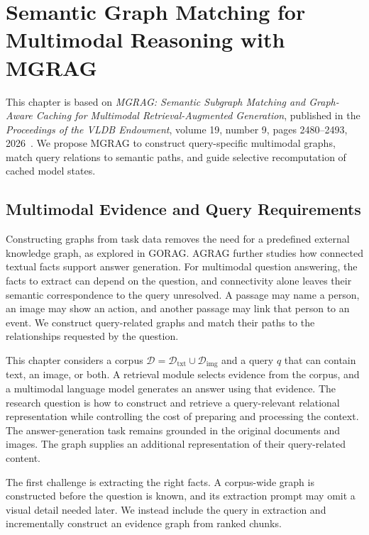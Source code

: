 \chapter{Semantic Graph Matching for Multimodal Reasoning with MGRAG}
\label{ch:mgrag}

This chapter is based on \emph{MGRAG: Semantic Subgraph Matching and Graph-Aware Caching for Multimodal Retrieval-Augmented Generation}, published in the \emph{Proceedings of the VLDB Endowment}, volume 19, number 9, pages 2480--2493, 2026~\cite{mgrag-paper}. We propose MGRAG to construct query-specific multimodal graphs, match query relations to semantic paths, and guide selective recomputation of cached model states.

\section{Multimodal Evidence and Query Requirements}
\label{sec:mgrag:problem}

Constructing graphs from task data removes the need for a predefined external knowledge graph, as explored in GORAG. AGRAG further studies how connected textual facts support answer generation. For multimodal question answering, the facts to extract can depend on the question, and connectivity alone leaves their semantic correspondence to the query unresolved. A passage may name a person, an image may show an action, and another passage may link that person to an event. We construct query-related graphs and match their paths to the relationships requested by the question.

This chapter considers a corpus $\mathcal D=\mathcal D_{\mathrm{txt}}\cup\mathcal D_{\mathrm{img}}$ and a query $q$ that can contain text, an image, or both. A retrieval module selects evidence from the corpus, and a multimodal language model generates an answer using that evidence. The research question is how to construct and retrieve a query-relevant relational representation while controlling the cost of preparing and processing the context. The answer-generation task remains grounded in the original documents and images. The graph supplies an additional representation of their query-related content.

The first challenge is extracting the right facts. A corpus-wide graph is constructed before the question is known, and its extraction prompt may omit a visual detail needed later. We instead include the query in extraction and incrementally construct an evidence graph from ranked chunks.

